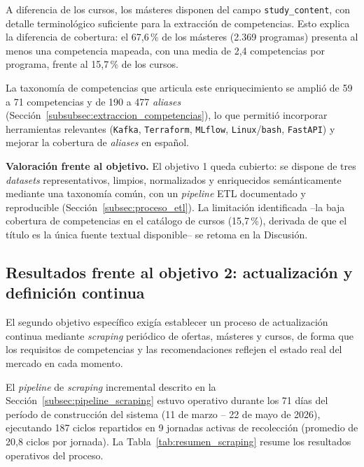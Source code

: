 A diferencia de los cursos, los másteres disponen del campo \texttt{study\_content}, con detalle terminológico suficiente para la extracción de competencias. Esto explica la diferencia de cobertura: el 67,6\,\% de los másteres (2.369 programas) presenta al menos una competencia mapeada, con una media de 2,4 competencias por programa, frente al 15,7\,\% de los cursos.

La taxonomía de competencias que articula este enriquecimiento se amplió de 59 a 71 competencias y de 190 a 477 \textit{aliases} (Sección~\ref{subsubsec:extraccion_competencias}), lo que permitió incorporar herramientas relevantes (\texttt{Kafka}, \texttt{Terraform}, \texttt{MLflow}, \texttt{Linux}/\texttt{bash}, \texttt{FastAPI}) y mejorar la cobertura de \textit{aliases} en español.

\textbf{Valoración frente al objetivo.} El objetivo 1 queda cubierto: se dispone de tres \textit{datasets} representativos, limpios, normalizados y enriquecidos semánticamente mediante una taxonomía común, con un \textit{pipeline} ETL documentado y reproducible (Sección~\ref{subsec:proceso_etl}). La limitación identificada --la baja cobertura de competencias en el catálogo de cursos (15,7\,\%), derivada de que el título es la única fuente textual disponible-- se retoma en la Discusión.

\subsection{Resultados frente al objetivo 2: actualización y definición continua}
\label{subsec:resultados_obj2}
El segundo objetivo específico exigía establecer un proceso de actualización continua mediante \textit{scraping} periódico de ofertas, másteres y cursos, de forma que los requisitos de competencias y las recomendaciones reflejen el estado real del mercado en cada momento.

El \textit{pipeline} de \textit{scraping} incremental descrito en la Sección~\ref{subsec:pipeline_scraping} estuvo operativo durante los 71 días del período de construcción del sistema (11 de marzo -- 22 de mayo de 2026), ejecutando 187 ciclos repartidos en 9 jornadas activas de recolección (promedio de 20,8 ciclos por jornada). La Tabla~\ref{tab:resumen_scraping} resume los resultados operativos del proceso.

